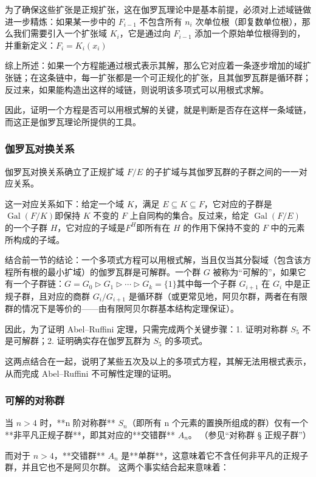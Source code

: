 为了确保这些扩张是正规扩张，这在伽罗瓦理论中是基本前提，必须对上述域链做进一步精炼：如果某一步中的 $F_{i-1}$ 不包含所有 $n_i$ 次单位根（即复数单位根），那么我们需要引入一个扩张域 $K_i$，它是通过向 $F_{i-1}$ 添加一个原始单位根得到的，并重新定义：$F_i = K_i(x_i)$

综上所述：如果一个方程能通过根式表示其解，那么它对应着一条逐步增加的域扩张链；在这条链中，每一扩张都是一个可正规化的扩张，且其伽罗瓦群是循环群；反过来，如果能构造出这样的域链，则说明该多项式可以用根式求解。

因此，证明一个方程是否可以用根式解的关键，就是判断是否存在这样一条域链，而这正是伽罗瓦理论所提供的工具。
\subsubsection{伽罗瓦对换关系}
伽罗瓦对换关系确立了正规扩域 $F/E$ 的子扩域与其伽罗瓦群的子群之间的一一对应关系。

这一对应关系如下：给定一个域 $K$，满足 $E \subseteq K \subseteq F$，它对应的子群是$\operatorname{Gal}(F/K)$即保持 $K$ 不变的 $F$ 上自同构的集合。反过来，给定 $\operatorname{Gal}(F/E)$ 的一个子群 $H$，它对应的子域是$F^H$即所有在 $H$ 的作用下保持不变的 $F$ 中的元素所构成的子域。

结合前一节的结论：一个多项式方程可以用根式解，当且仅当其分裂域（包含该方程所有根的最小扩域）的伽罗瓦群是可解群。一个群 $G$ 被称为“可解的”，如果它有一个子群链：$G = G_0 \triangleright G_1 \triangleright \cdots \triangleright G_k = \{1\}$其中每一个子群 $G_{i+1}$ 在 $G_i$ 中是正规子群，且对应的商群 $G_i / G_{i+1}$ 是循环群（或更常见地，阿贝尔群，两者在有限群的情况下是等价的——由有限阿贝尔群基本结构定理保证）。

因此，为了证明 Abel–Ruffini 定理，只需完成两个关键步骤：1. 证明对称群 $S_5$ 不是可解群；2. 证明确实存在伽罗瓦群为 $S_5$ 的多项式。

这两点结合在一起，说明了某些五次及以上的多项式方程，其解无法用根式表示，从而完成 Abel–Ruffini 不可解性定理的证明。

\subsubsection{可解的对称群}

当 $n > 4$ 时，**n 阶对称群** $S_n$（即所有 n 个元素的置换所组成的群）仅有一个**非平凡正规子群**，即其对应的**交错群** $A_n$。
（参见“对称群 § 正规子群”）

而对于 $n > 4$，**交错群** $A_n$ 是**单群**，这意味着它不含任何非平凡的正规子群，并且它也不是阿贝尔群。
这两个事实结合起来意味着：

